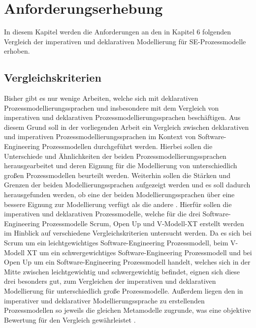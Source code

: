 
\chapter{Anforderungserhebung}\label{sec:chapter5}
In diesem Kapitel werden die Anforderungen an den in Kapitel 6 folgenden Vergleich der imperativen und deklarativen Modellierung für SE-Prozessmodelle erhoben.

\section{Vergleichskriterien}\label{sec:chapter5:Vergleichskriterien}

Bisher gibt es nur wenige Arbeiten, welche sich mit deklarativen Prozessmodellierungssprachen und insbesondere mit dem Vergleich von imperativen und deklarativen Prozessmodellierungssprachen beschäftigen. Aus diesem Grund soll in der vorliegenden Arbeit ein Vergleich zwischen deklarativen und imperativen Prozessmodellierungssprachen im Kontext von Software-Engineering Prozessmodellen durchgeführt werden. Hierbei sollen die Unterschiede und Ähnlichkeiten der beiden Prozessmodellierungssprachen herausgearbeitet und deren Eignung für die Modellierung von unterschiedlich großen Prozessmodellen beurteilt werden. Weiterhin sollen die Stärken und Grenzen der beiden Modellierungssprachen aufgezeigt werden und es soll dadurch herausgefunden werden, ob eine der beiden Modellierungssprachen über eine bessere Eignung zur Modellierung verfügt als die andere \cite{list2006evaluation}.\newline
Hierfür sollen die imperativen und deklarativen Prozessmodelle, welche für die drei Software-Engineering Prozessmodelle Scrum, Open Up und V-Modell-XT erstellt werden im Hinblick auf verschiedene Vergleichskriterien untersucht werden. Da es sich bei Scrum um ein leichtgewichtiges Software-Engineering Prozessmodell, beim V-Modell XT um ein schwergewichtiges Software-Engineering Prozessmodell und bei Open Up um ein Software-Engineering Prozessmodell handelt, welches sich in der Mitte zwischen leichtgewichtig und schwergewichtig befindet, eignen sich diese drei besonders gut, zum Vergleichen der imperativen und deklarativen Modellierung für unterschiedlich große Prozessmodelle. Außerdem liegen den in imperativer und deklarativer Modellierungssprache zu erstellenden Prozessmodellen so jeweils die gleichen Metamodelle zugrunde, was eine objektive Bewertung für den Vergleich gewährleistet \cite{list2006evaluation}.  

